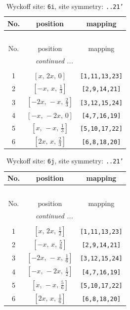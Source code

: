 \documentclass[fleqn,8pt]{jsarticle}
\begin{document}
\renewcommand{\arraystretch}{1.2}
\begin{longtable}{ccc}
\caption{Wyckoff site: {\tt 6i}, site symmetry: {\tt ..21'}}
 \\
 \hline \hline
No. & position & mapping \\ \hline \endfirsthead

\multicolumn{2}{l}{\tablename\ \thetable{}} \\
 \hline \hline
No. & position & mapping \\ \hline \endhead

 \hline \hline
\multicolumn{2}{r}{\footnotesize\it continued ...} \\ \endfoot

 \hline \hline
\multicolumn{2}{r}{} \\ \endlastfoot

1 & $\left[ x,\, 2 x,\, 0 \right]$ & {\tt [1,11,13,23]} \\ \hline
2 & $\left[ - x,\, x,\, \frac{1}{3} \right]$ & {\tt [2,9,14,21]} \\ \hline
3 & $\left[ - 2 x,\, - x,\, \frac{2}{3} \right]$ & {\tt [3,12,15,24]} \\ \hline
4 & $\left[ - x,\, - 2 x,\, 0 \right]$ & {\tt [4,7,16,19]} \\ \hline
5 & $\left[ x,\, - x,\, \frac{1}{3} \right]$ & {\tt [5,10,17,22]} \\ \hline
6 & $\left[ 2 x,\, x,\, \frac{2}{3} \right]$ & {\tt [6,8,18,20]} \\
\end{longtable}
\renewcommand{\arraystretch}{1.2}
\begin{longtable}{ccc}
\caption{Wyckoff site: {\tt 6j}, site symmetry: {\tt ..21'}}
 \\
 \hline \hline
No. & position & mapping \\ \hline \endfirsthead

\multicolumn{2}{l}{\tablename\ \thetable{}} \\
 \hline \hline
No. & position & mapping \\ \hline \endhead

 \hline \hline
\multicolumn{2}{r}{\footnotesize\it continued ...} \\ \endfoot

 \hline \hline
\multicolumn{2}{r}{} \\ \endlastfoot

1 & $\left[ x,\, 2 x,\, \frac{1}{2} \right]$ & {\tt [1,11,13,23]} \\ \hline
2 & $\left[ - x,\, x,\, \frac{5}{6} \right]$ & {\tt [2,9,14,21]} \\ \hline
3 & $\left[ - 2 x,\, - x,\, \frac{1}{6} \right]$ & {\tt [3,12,15,24]} \\ \hline
4 & $\left[ - x,\, - 2 x,\, \frac{1}{2} \right]$ & {\tt [4,7,16,19]} \\ \hline
5 & $\left[ x,\, - x,\, \frac{5}{6} \right]$ & {\tt [5,10,17,22]} \\ \hline
6 & $\left[ 2 x,\, x,\, \frac{1}{6} \right]$ & {\tt [6,8,18,20]} \\
\end{longtable}
\end{document}
